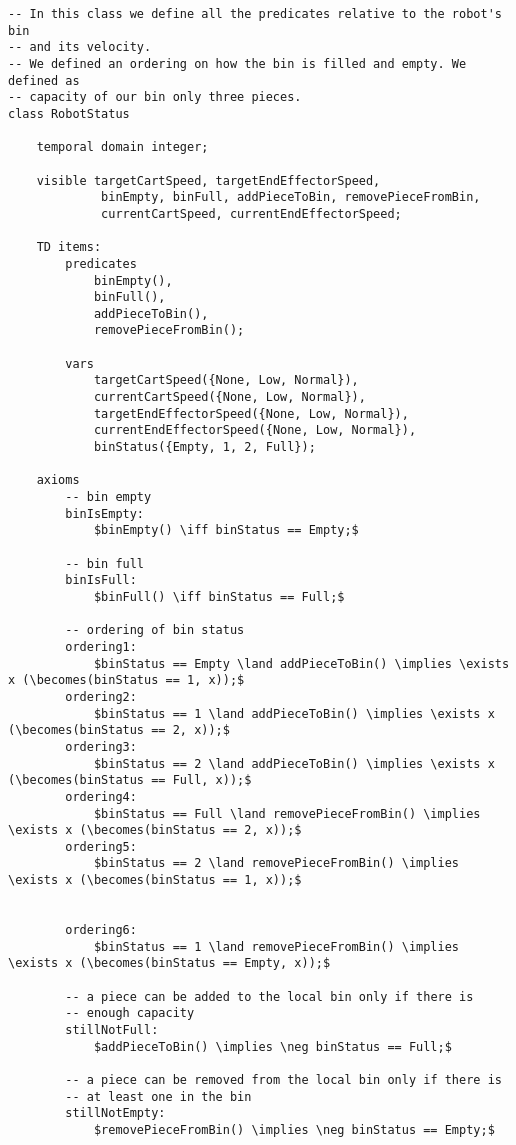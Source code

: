 \begin{lstlisting}[fontadjust, mathescape, frame=single] 
-- In this class we define all the predicates relative to the robot's bin 
-- and its velocity.
-- We defined an ordering on how the bin is filled and empty. We defined as 
-- capacity of our bin only three pieces.
class RobotStatus

    temporal domain integer;

    visible targetCartSpeed, targetEndEffectorSpeed, 
             binEmpty, binFull, addPieceToBin, removePieceFromBin,
             currentCartSpeed, currentEndEffectorSpeed;

    TD items:
        predicates
            binEmpty(),
            binFull(),
            addPieceToBin(),
            removePieceFromBin();

        vars
            targetCartSpeed({None, Low, Normal}),
            currentCartSpeed({None, Low, Normal}),
            targetEndEffectorSpeed({None, Low, Normal}),
            currentEndEffectorSpeed({None, Low, Normal}),
            binStatus({Empty, 1, 2, Full});

    axioms
        -- bin empty
        binIsEmpty:
            $binEmpty() \iff binStatus == Empty;$

        -- bin full
        binIsFull:
            $binFull() \iff binStatus == Full;$

        -- ordering of bin status
        ordering1:
            $binStatus == Empty \land addPieceToBin() \implies \exists x (\becomes(binStatus == 1, x));$
        ordering2:
            $binStatus == 1 \land addPieceToBin() \implies \exists x (\becomes(binStatus == 2, x));$
        ordering3:
            $binStatus == 2 \land addPieceToBin() \implies \exists x (\becomes(binStatus == Full, x));$
        ordering4:
            $binStatus == Full \land removePieceFromBin() \implies \exists x (\becomes(binStatus == 2, x));$
        ordering5:
            $binStatus == 2 \land removePieceFromBin() \implies \exists x (\becomes(binStatus == 1, x));$

            
        ordering6:
            $binStatus == 1 \land removePieceFromBin() \implies \exists x (\becomes(binStatus == Empty, x));$

        -- a piece can be added to the local bin only if there is 
        -- enough capacity
        stillNotFull:
            $addPieceToBin() \implies \neg binStatus == Full;$

        -- a piece can be removed from the local bin only if there is
        -- at least one in the bin
        stillNotEmpty:
            $removePieceFromBin() \implies \neg binStatus == Empty;$


\end{lstlisting}
